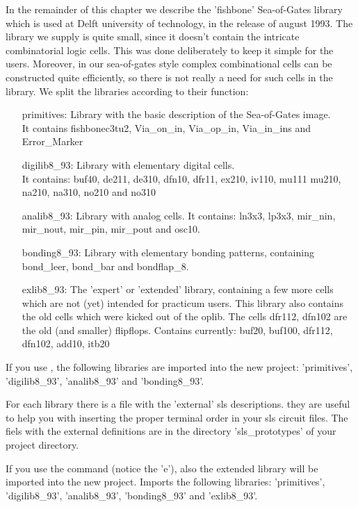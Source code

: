 In the remainder of this chapter we describe the 'fishbone'
Sea-of-Gates library which is used at Delft university of
technology, in the release of august 1993.  The library we supply
is quite small, since it doesn't contain the intricate
combinatorial logic cells. This was done deliberately to keep it
simple for the users. Moreover, in our sea-of-gates style complex
combinational cells can be constructed quite efficiently, so there
is not really a need for such cells in the library.  We split the
libraries according to their function:
\begin{itemize}
\item[primitives:]
Library with the basic description of the Sea-of-Gates image.\\
It contains fishbonec3tu2, Via\_on\_in, Via\_op\_in,
Via\_in\_ins and Error\_Marker
\item[digilib8\_93:]
Library with elementary digital cells.\\
It contains: buf40, de211, de310, dfn10, dfr11, ex210, iv110, mu111
mu210, na210, na310, no210 and no310
\item[analib8\_93:]  
Library with analog cells. It contains: ln3x3, lp3x3, mir\_nin,
mir\_nout, mir\_pin, mir\_pout and osc10.
\item[bonding8\_93:]
Library with elementary bonding patterns, containing bond\_leer,
bond\_bar and bondflap\_8.
\item[exlib8\_93:]
The 'expert' or 'extended' library, containing a few more cells
which are not (yet) intended for practicum users. This library
also contains the old cells which were kicked out of the oplib.
The cells dfr112, dfn102 are the old (and smaller) flipflops.
Contains currently: buf20, buf100, dfr112, dfn102, add10, itb20
\end{itemize}

If you use , 
the following libraries are imported into the
new project: 'primitives', 'digilib8\_93', 'analib8\_93' and
'bonding8\_93'.

For each library there is a file with the 'external' sls
descriptions. they are useful to help you with inserting the
proper terminal order in your sls circuit files. The fiels with
the external definitions are in the directory 'sls\_prototypes'
of your project directory.

If you use the command  
(notice the 'e'), also the
extended library will be imported into the new project. 
Imports the following libraries: 'primitives', 'digilib8\_93',
'analib8\_93', 'bonding8\_93' and 'exlib8\_93'.

